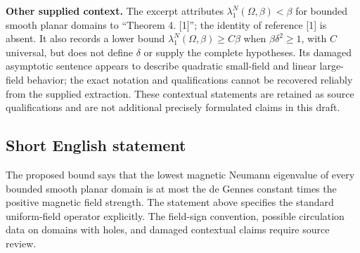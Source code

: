 \documentclass[11pt]{article}
\begin{document}
\textbf{Other supplied context.} The excerpt attributes \(\lambda_1^N(\Omega,\beta)<\beta\) for bounded smooth planar domains to ``Theorem 4. [1]''; the identity of reference [1] is absent. It also records a lower bound \(\lambda_1^N(\Omega,\beta)\geq C\beta\) when \(\beta\delta^2\geq1\), with \(C\) universal, but does not define \(\delta\) or supply the complete hypotheses. Its damaged asymptotic sentence appears to describe quadratic small-field and linear large-field behavior; the exact notation and qualifications cannot be recovered reliably from the supplied extraction. These contextual statements are retained as source qualifications and are not additional precisely formulated claims in this draft.
\subsection{Short English statement}
The proposed bound says that the lowest magnetic Neumann eigenvalue of every bounded smooth planar domain is at most the de Gennes constant times the positive magnetic field strength. The statement above specifies the standard uniform-field operator explicitly. The field-sign convention, possible circulation data on domains with holes, and damaged contextual claims require source review.
\end{document}

